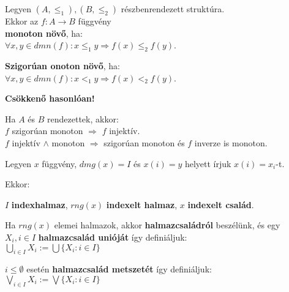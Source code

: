\begin{frame}
\begin{tcolorbox}[title={Def.: Monoton, Szigorúan monoton függvények}]
Legyen $(A, {\leq}_1), (B, {\leq}_2)$ részbenrendezett struktúra.\\
Ekkor az $f : A \rightarrow B$ függvény\\
\textbf{monoton növő}, ha:\\
${\forall}x, y \in dmn(f) : x {\leq}_1 y \Rightarrow f(x) {\leq}_2 f(y)$.\\
\mmedskip

\textbf{Szigorúan onoton növő}, ha:\\
${\forall}x, y \in dmn(f) : x <_1 y \Rightarrow f(x) <_2 f(y)$.\\
\mmedskip

\textbf{Csökkenő hasonlóan!}
\end{tcolorbox}

\begin{tcolorbox}[title={Ész}]
Ha $A$ és $B$ rendezettek, akkor:\\
$f$ szigorúan monoton $\Rightarrow$ $f$ injektív.\\
$f$ injektív $\land$ monoton $\Rightarrow$ szigorúan monoton és $f$ inverze is monoton.
\end{tcolorbox}
\end{frame}


\begin{frame}
\begin{tcolorbox}[title={Def.: Családok (Indexhalmaz, Indexelt halmaz, Indexelt család)}]
Legyen $x$ függvény, $dmg(x) = I$ és $x(i) = y$ helyett írjuk $x(i) = x_i$-t.\\
\mmedskip

Ekkor:\\
\msmallskip

$I$ \textbf{indexhalmaz}, $rng(x)$ \textbf{indexelt halmaz}, $x$ \textbf{indexelt család}.\\
\msmallskip

Ha $rng(x)$ elemei halmazok, akkor \textbf{halmazcsaládról} beszélünk, és egy $X_i, i \in I$ \textbf{halmazcsalád unióját} így definiáljuk:\\
${\bigcup}_{i \in I} X_i := {\bigcup}\{ X_i : i \in I\}$\\
\mmedskip

$i \leq \emptyset$ esetén \textbf{halmazcsalád metszetét} így definiáljuk:\\
${\bigvee}_{i \in I} X_i := {\bigvee}\{ X_i : i \in I\}$
\end{tcolorbox}
\end{frame}


